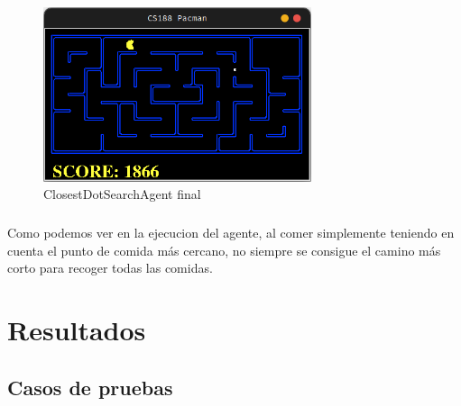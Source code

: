 \documentclass{report}
\begin{document}
          \begin{figure}[H]
            \centering
            \includegraphics[width=0.7\textwidth]{.img/2.8.3.png}
            \caption{ClosestDotSearchAgent final}
          \end{figure}
          \paragraph*{}
          {
            Como podemos ver en la ejecucion del agente, al comer simplemente teniendo en cuenta el punto de comida más cercano, no siempre se consigue el camino más corto para recoger todas las comidas.\\
          }
    \chapter{Resultados}
      \section{Casos de pruebas}
\end{document}
